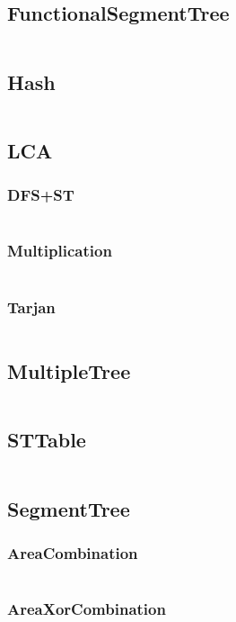 \documentclass[a4paper,11pt]{article}
\begin{document}
\subsection{FunctionalSegmentTree}
\inputminted[breaklines]{c++}{03++DataStructure/+FunctionalSegmentTree.cpp}
\subsection{Hash}
\inputminted[breaklines]{c++}{03++DataStructure/+Hash.cpp}
\subsection{LCA}
\subsubsection{DFS+ST}
\inputminted[breaklines]{c++}{03++DataStructure/+LCA/+DFS+ST.cpp}
\subsubsection{Multiplication}
\inputminted[breaklines]{c++}{03++DataStructure/+LCA/+Multiplication.cpp}
\subsubsection{Tarjan}
\inputminted[breaklines]{c++}{03++DataStructure/+LCA/+Tarjan.cpp}

\subsection{MultipleTree}
\inputminted[breaklines]{c++}{03++DataStructure/+MultipleTree.cpp}
\subsection{STTable}
\inputminted[breaklines]{c++}{03++DataStructure/+STTable.cpp}
\subsection{SegmentTree}
\subsubsection{AreaCombination}
\inputminted[breaklines]{c++}{03++DataStructure/+SegmentTree/+AreaCombination.cpp}
\subsubsection{AreaXorCombination}
\inputminted[breaklines]{c++}{03++DataStructure/+SegmentTree/+AreaXorCombination.cpp}
\end{document}
